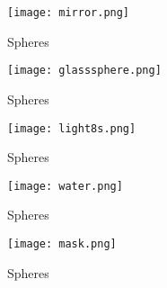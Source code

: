 \begin{figure}[htb!]
\centering
  \caption{Spheres}
  \texttt{[image: mirror.png]}
\end{figure}


\begin{figure}[htb!]
\centering
  \caption{Spheres}
  \texttt{[image: glasssphere.png]}
\end{figure}

\begin{figure}[htb!]
\centering
  \caption{Spheres}
  \texttt{[image: light8s.png]}
\end{figure}


\begin{figure}[htb!]
\centering
  \caption{Spheres}
  \texttt{[image: water.png]}
\end{figure}

\begin{figure}[htb!]
\centering
  \caption{Spheres}
  \texttt{[image: mask.png]}
\end{figure}

